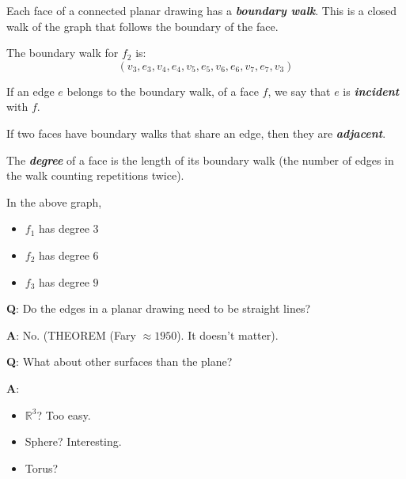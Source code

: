 Each face of a connected planar drawing has a \textbf{\emph{boundary walk}}.
This is a closed walk of the graph that follows the boundary of the face.

The boundary walk for $ f_2 $ is:
\[ (v_3,e_3,v_4,e_4,v_5,e_5,v_6,e_6,v_7,e_7,v_3) \]

\begin{defbox}
    \begin{definition}
        If an edge $ e $ belongs to the boundary walk, of a face $ f $,
        we say that $ e $ is \textbf{\emph{incident}} with $ f $.
    \end{definition}
\end{defbox}

\begin{defbox}
    \begin{definition}
        If two faces have boundary walks that share an edge,
        then they are \textbf{\emph{adjacent}}.
    \end{definition}
\end{defbox}

\begin{defbox}
    \begin{definition}
        The \textbf{\emph{degree}} of a face is the length of its
        boundary walk (the number of edges in the walk counting repetitions
        twice).
    \end{definition}
\end{defbox}

\begin{exbox}
    \begin{example}[Degree]
        In the above graph,
        \begin{itemize}
            \item $ f_1 $ has degree $ 3 $
            \item $ f_2 $ has degree $ 6 $
            \item $ f_3 $ has degree $ 9 $
        \end{itemize}
    \end{example}
\end{exbox}

\textbf{Q}: Do the edges in a planar drawing need to be straight
lines?

\textbf{A}: No. (THEOREM (Fary $ \approx 1950 $). It doesn't matter).

\textbf{Q}: What about other surfaces than the plane?

\textbf{A}:
\begin{itemize}
    \item $ \mathbb{R}^3 $? Too easy.
    \item Sphere? Interesting.
    \item Torus?
\end{itemize}


